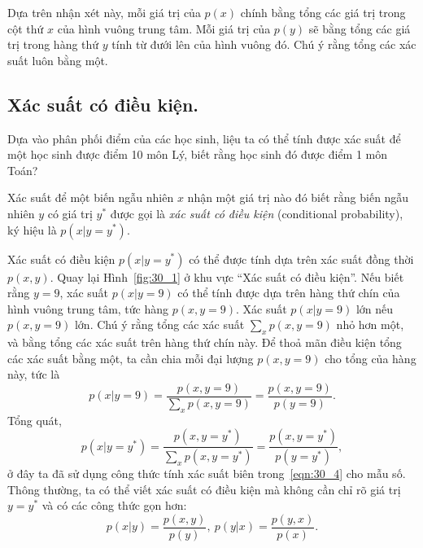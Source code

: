 Dựa trên nhận xét này, mỗi giá trị của $p(x)$ chính bằng tổng các giá trị trong
cột thứ $x$ của hình vuông trung tâm. Mỗi giá trị của $p(y)$ sẽ bằng tổng các
giá trị trong hàng thứ $y$ tính từ đưới lên của hình vuông đó. Chú ý rằng tổng
các xác suất luôn bằng một.


\subsection{Xác suất có điều kiện.}

{Dựa vào phân phối điểm của các học sinh, liệu ta có thể tính được xác suất để
một học sinh được điểm 10 môn Lý, biết rằng học sinh đó được điểm 1 môn Toán?}

Xác suất để một biến ngẫu nhiên $x$ nhận một giá trị nào đó biết
rằng biến ngẫu nhiên $y$ có giá trị $y^*$ được gọi là \textit{xác suất có điều
kiện} (conditional probability), ký hiệu là $p(x| y = y^*)$.


Xác suất có điều kiện $p(x | y = y^*)$ có thể được tính dựa trên xác suất đồng
thời $p(x, y)$. Quay lại Hình~\ref{fig:30_1} ở khu vực ``Xác suất có điều
kiện''. Nếu biết rằng $y = 9$, xác suất $p(x | y = 9)$ có thể tính được dựa trên
hàng thứ chín của hình vuông trung tâm, tức hàng $p(x, y = 9)$. Xác suất $p(x | y =
9) $ lớn nếu $p(x, y= 9)$ lớn. Chú ý rằng tổng các xác suất $\sum_{x} p(x,
y = 9)$ nhỏ hơn một, và bằng tổng các xác suất trên hàng thứ chín này. Để thoả
mãn điều kiện tổng các xác suất bằng một, ta cần chia mỗi đại lượng $p(x, y =
9)$ cho tổng của hàng này, tức là
\begin{equation}
  p(x | y = 9) =\frac{p(x, y = 9)}{\sum \limits_x p(x, y = 9)} =
                \frac{p(x, y = 9)}{p(y = 9)}.
\end{equation}
Tổng quát,
\begin{equation}
\label{eqn:30_9}
\displaystyle
  p(x|y = y^*) = \frac{p(x, y = y^*)}{\sum \limits_{x} p(x, y = y^*)} =
  \frac{p(x, y = y^*)}{p(y = y^*)},
\end{equation}
ở đây ta đã sử dụng công thức tính xác suất biên trong~\eqref{eqn:30_4} cho mẫu
số. Thông thường, ta có thể viết xác suất có điều kiện mà không cần chỉ rõ giá trị $y = y^*$ và có các công thức gọn hơn:
\begin{equation}
  \label{eqn:30_2_b}
  p(x |y) = \frac{p(x, y)}{p(y)}, ~p(y | x) = \frac{p(y, x)}{p(x)}.
\end{equation}

